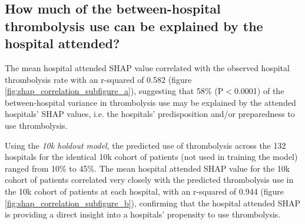 \subsection{How much of the between-hospital thrombolysis use can be explained by the hospital attended?}

The mean hospital attended SHAP value correlated with the observed hospital thrombolysis rate with an r-squared of 0.582 (figure \ref{fig:shap_correlation_subfigure_a}), suggesting that 58\% (P$<$0.0001) of the between-hospital variance in thrombolysis use may be explained by the attended hospitals' SHAP values, i.e. the hospitals' predisposition and/or preparedness to use thrombolysis. %

Using the \emph{10k holdout model}, the predicted use of thrombolysis across the 132 hospitals for the identical 10k cohort of patients (not used in training the model) ranged from 10\% to 45\%. The mean hospital attended SHAP value for the 10k cohort of patients correlated very closely with the predicted thrombolysis use in the 10k cohort of patients at each hospital, with an r-squared of 0.944 (figure \ref{fig:shap_correlation_subfigure_b}), confirming that the hospital attended SHAP is providing a direct insight into a hospitals' propensity to use thrombolysis.

